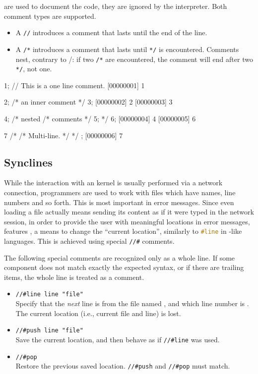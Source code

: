  are used to document the code, they are ignored by the
\us interpreter. Both \Cxx comment types are supported.

\begin{itemize}
\item A \lstinline|//| introduces a comment that lasts until the end
  of the line.
\item A \lstinline|/*| introduces a comment that lasts until \lstinline|*/|
  is encountered. Comments nest, contrary to \langC/\Cxx: if two \lstinline|/*|
  are encountered, the comment will end after two \lstinline|*/|, not one.
\end{itemize}

\begin{urbiscript}
1; // This is a one line comment.
[00000001] 1

2; /* an inner comment */ 3;
[00000002] 2
[00000003] 3

4; /* nested /* comments */ 5; */ 6;
[00000004] 4
[00000005] 6

7
  /*
    /*
       Multi-line.
    */
  */
;
[00000006] 7
\end{urbiscript}

\subsection{Synclines}
\label{sec:specs:synclines}

While the interaction with an \us kernel is usually performed via a network
connection, programmers are used to work with files which have names, line
numbers and so forth.  This is most important in error messages.  Since even
loading a file actually means sending its content as if it were typed in the
network session, in order to provide the user with meaningful locations in
error messages, \us features , a means to change
the ``current location'', similarly to \lstinline[language=C]|#line| in
\langC-like languages.  This is achieved using special \lstinline|//#| comments.

The following special comments are recognized only as a whole line.
If some component does not match exactly the expected syntax, or if
there are trailing items, the whole line is treated as a comment.
\begin{itemize}
\item \lstinline|//#line line "file"|\\
  Specify that the \emph{next} line is from the file named ,
  and which line number is .  The current location (i.e.,
  current file and line) is lost.

\item \lstinline|//#push line "file"|\\
  Save the current location, and then behave as if \lstinline|//#line|
  was used.

\item \lstinline|//#pop|\\
  Restore the previous saved location.  \lstinline|//#push| and
  \lstinline|//#pop| must match.
\end{itemize}



